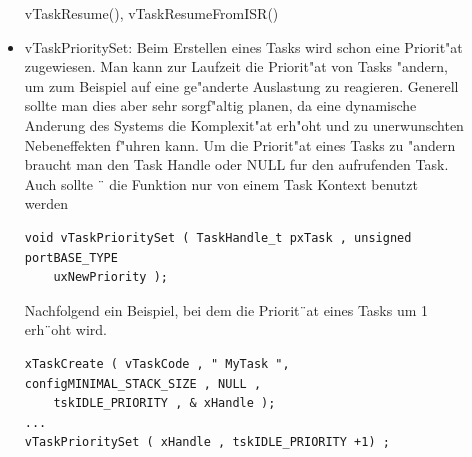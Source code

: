 \documentclass[a4paper, 8pt]{extarticle}
\begin{document}
\begin{multicols*}{3}
\begin{description}
\begin{itemize}
						vTaskResume(), vTaskResumeFromISR()	
						\item vTaskPrioritySet: Beim Erstellen eines Tasks wird schon eine Priorit"at zugewiesen. Man kann zur
						Laufzeit die Priorit"at von Tasks "andern, um zum Beispiel auf eine ge"anderte
						Auslastung zu reagieren. Generell sollte man dies aber sehr sorgf"altig planen,
						da eine dynamische Anderung des Systems die Komplexit"at erh"oht und zu unerwunschten Nebeneffekten f"uhren kann. Um die Priorit"at eines Tasks zu "andern
						braucht man den Task Handle oder NULL fur den aufrufenden Task. Auch sollte ¨
						die Funktion nur von einem Task Kontext benutzt werden
						\begin{lstlisting}
void vTaskPrioritySet ( TaskHandle_t pxTask , unsigned portBASE_TYPE
	uxNewPriority );
						\end{lstlisting}
						Nachfolgend ein Beispiel, bei dem die Priorit¨at eines Tasks um 1 erh¨oht wird.	
						\begin{lstlisting}
xTaskCreate ( vTaskCode , " MyTask ", configMINIMAL_STACK_SIZE , NULL ,
	tskIDLE_PRIORITY , & xHandle );
...
vTaskPrioritySet ( xHandle , tskIDLE_PRIORITY +1) ;
						\end{lstlisting}			
					\end{itemize} 
				\end{description}

\end{multicols*}
\end{document}

